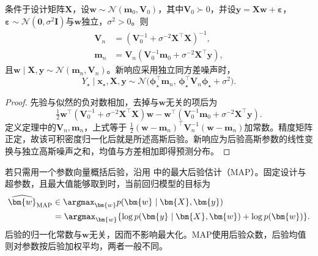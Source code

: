 \begin{theorem}[贝叶斯线性回归的后验与预测]
  \label{thm:regression-bayesian-linear}
  条件于设计矩阵$\bm{X}$，设$\bm{w}\sim\mathcal{N}(\bm{m}_0,\bm{V}_0)$，其中$\bm{V}_0\succ0$，并设$\bm{y}=\bm{X}\bm{w}+\bm{\varepsilon}$，$\bm{\varepsilon}\sim\mathcal{N}(\bm{0},\sigma^2\bm{I})$与$\bm{w}$独立，$\sigma^2>0$。则
  \[
    \begin{aligned}
      \bm{V}_n&=(\bm{V}_0^{-1}+\sigma^{-2}\bm{X}^{\top}\bm{X})^{-1},\\
      \bm{m}_n&=\bm{V}_n
          (\bm{V}_0^{-1}\bm{m}_0+\sigma^{-2}\bm{X}^{\top}\bm{y}),
    \end{aligned}
  \]
  且$\bm{w}\mid\bm{X},\bm{y}\sim\mathcal{N}(\bm{m}_n,\bm{V}_n)$。新响应采用独立同方差噪声时，
  \[
    Y_{\star}\mid\bm{x}_{\star},\bm{X},\bm{y}
    \sim\mathcal{N}\bigl(
      \bm{\phi}_{\star}^{\top}\bm{m}_n,\,
      \bm{\phi}_{\star}^{\top}\bm{V}_n\bm{\phi}_{\star}+\sigma^2\bigr).
  \]
\end{theorem}

\begin{proof}
先验与似然的负对数相加，去掉与$\bm{w}$无关的项后为
\[
  \tfrac12\bm{w}^{\top}
       (\bm{V}_0^{-1}+\sigma^{-2}\bm{X}^{\top}\bm{X})\bm{w}
  -\bm{w}^{\top}
       (\bm{V}_0^{-1}\bm{m}_0+\sigma^{-2}\bm{X}^{\top}\bm{y}).
\]
定义定理中的$\bm{V}_n,\bm{m}_n$，上式等于
$\tfrac12(\bm{w}-\bm{m}_n)^{\top}\bm{V}_n^{-1}(\bm{w}-\bm{m}_n)$加常数。精度矩阵正定，故该可积密度归一化后就是所述高斯后验。新响应为后验高斯参数的线性变换与独立高斯噪声之和，均值与方差相加即得预测分布。
\end{proof}

若只需用一个参数向量概括后验，沿用
中的最大后验估计（MAP）。固定设计与超参数，且最大值能够取到时，当前回归模型的目标为
\begin{equation}
  \begin{aligned}
    \widehat{\bm{w}}_{\mathrm{MAP}}
      &\in\argmax_{\bm{w}}p(\bm{w}\mid\bm{X},\bm{y})\\
      &=\argmax_{\bm{w}}
        \{\log p(\bm{y}\mid\bm{X},\bm{w})+\log p(\bm{w})\}.
  \end{aligned}
  \label{eq:regression-map}
\end{equation}
后验的归一化常数与$\bm{w}$无关，因而不影响最大化。MAP使用后验众数，后验均值则对参数按后验加权平均，两者一般不同。

